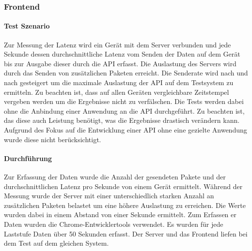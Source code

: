 \documentclass[a4paper]{spie}  %
\begin{document}
\subsubsection{Frontend}

\paragraph{Test Szenario} Zur Messung der Latenz wird ein Gerät mit dem Server verbunden und jede Sekunde dessen durchschnittliche Latenz vom Senden der Daten auf dem Gerät bis zur Ausgabe dieser durch die API erfasst. Die Auslastung des Servers wird durch das Senden von zusätzlichen Paketen erreicht. Die Senderate wird nach und nach gesteigert um die maximale Auslastung der API auf dem Testsystem zu ermitteln. Zu beachten ist, dass auf allen Geräten vergleichbare Zeitstempel vergeben werden um die Ergebnisse nicht zu verfälschen. Die Tests werden dabei ohne die Anbindung einer Anwendung an die API durchgeführt. Zu beachten ist, das diese auch Leistung benötigt, was die Ergebnisse drastisch verändern kann. Aufgrund des Fokus auf die Entwicklung einer API ohne eine gezielte Anwendung wurde diese nicht berücksichtigt.


\paragraph{Durchführung}
Zur Erfassung der Daten wurde die Anzahl der gesendeten Pakete und der durchschnittlichen Latenz pro Sekunde von einem Gerät ermittelt. Während der Messung wurde der Server mit einer unterschiedlich starken Anzahl an zusätzlichen Paketen belastet um eine höhere Auslastung zu erreichen. Die Werte wurden dabei in einem Abstand von einer Sekunde ermittelt. Zum Erfassen er Daten wurden die Chrome-Entwicklertools verwendet. Es wurden für jede Laststufe Daten über 50 Sekunden erfasst. Der Server und das Frontend liefen bei dem Test auf dem gleichen System.
\end{document}
